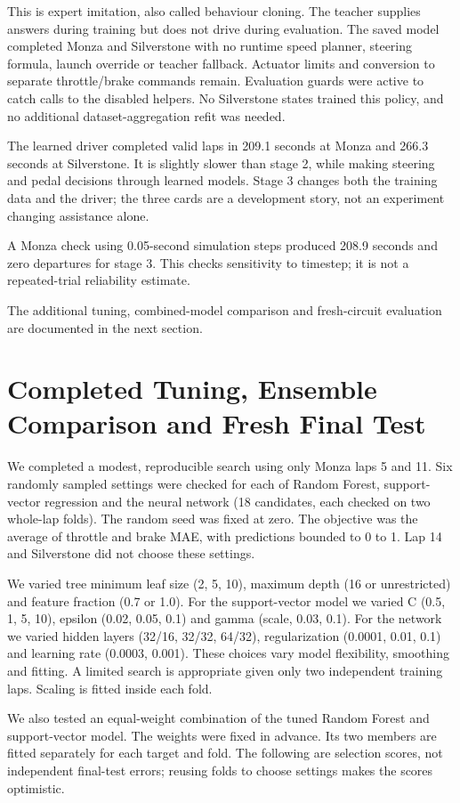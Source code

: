 \documentclass[11pt,a4paper]{article}
\begin{document}
This is expert imitation, also called behaviour cloning. The teacher supplies answers during training but does not drive during evaluation. The saved model completed Monza and Silverstone with no runtime speed planner, steering formula, launch override or teacher fallback. Actuator limits and conversion to separate throttle/brake commands remain. Evaluation guards were active to catch calls to the disabled helpers. No Silverstone states trained this policy, and no additional dataset-aggregation refit was needed.

The learned driver completed valid laps in 209.1 seconds at Monza and 266.3 seconds at Silverstone. It is slightly slower than stage 2, while making steering and pedal decisions through learned models. Stage 3 changes both the training data and the driver; the three cards are a development story, not an experiment changing assistance alone.

A Monza check using 0.05-second simulation steps produced 208.9 seconds and zero departures for stage 3. This checks sensitivity to timestep; it is not a repeated-trial reliability estimate.

The additional tuning, combined-model comparison and fresh-circuit evaluation are documented in the next section.
\section{Completed Tuning, Ensemble Comparison and Fresh Final Test}
We completed a modest, reproducible search using only Monza laps 5 and 11. Six randomly sampled settings were checked for each of Random Forest, support-vector regression and the neural network (18 candidates, each checked on two whole-lap folds). The random seed was fixed at zero. The objective was the average of throttle and brake MAE, with predictions bounded to 0 to 1. Lap 14 and Silverstone did not choose these settings.

We varied tree minimum leaf size (2, 5, 10), maximum depth (16 or unrestricted) and feature fraction (0.7 or 1.0). For the support-vector model we varied C (0.5, 1, 5, 10), epsilon (0.02, 0.05, 0.1) and gamma (scale, 0.03, 0.1). For the network we varied hidden layers (32/16, 32/32, 64/32), regularization (0.0001, 0.01, 0.1) and learning rate (0.0003, 0.001). These choices vary model flexibility, smoothing and fitting. A limited search is appropriate given only two independent training laps. Scaling is fitted inside each fold.

We also tested an equal-weight combination of the tuned Random Forest and support-vector model. The weights were fixed in advance. Its two members are fitted separately for each target and fold. The following are selection scores, not independent final-test errors; reusing folds to choose settings makes the scores optimistic.
\end{document}
